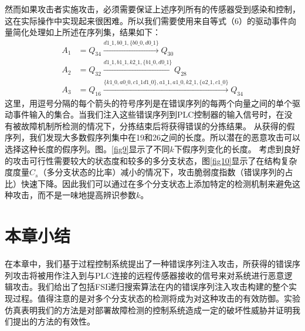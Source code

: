 然而如果攻击者实施攻击，必须需要保证上述序列所有的传感器受到感染和控制，这在实际操作中实现起来很困难。所以我们需要使用来自等式（6）的驱动事件向量简化处理如上所述在序列集，结果如下：\[\begin{split} A_1&=Q_{34}\xrightarrow{d1\_1,b0\_1,\{b0\_0,d0\_1\}}Q_{30}\\A_2&=Q_{32}\xrightarrow{d1\_1,b1\_1,k2\_1,\{b1\_0,d0\_1\}}Q_{28}\\A_3&=Q_{16}\xrightarrow{\{k1\_0,a0\_0,c1\_1d1\_0\},a1\_1,a1\_0,k2\_1,\{a2\_1,c1\_0\}}Q_{34} \end{split}\]这里，用逗号分隔的每个箭头的符号序列是在错误序列的每两个向量之间的单个驱动事件输入的集合。当我们注入这些错误序列到PLC控制器的输入信号时，在没有被故障机制所检测的情况下，分拣结束后将获得错误的分拣结果。
从获得的假序列，我们发现大多数假序列集中在19和26之间的长度。所以潜在的恶意攻击可以选择这种长度的假序列。图。\ref{fig9}显示了不同$ k $下假序列变化的长度。
考虑到良好的攻击可行性需要较大的状态度和较多的多分支状态，图\ref{fig10}显示了在结构复杂度度量$ C_s $（多分支状态的比率）减小的情况下，攻击脆弱度指数（错误序列的占比）快速下降。因此我们可以通过在多个分支状态上添加特定的检测机制来避免这种攻击，而不是一味地提高辨识参数$ k $。

\section{本章小结}

在本章中，我们基于过程控制系统提出了一种错误序列注入攻击，所获得的错误序列攻击将被用作注入到与PLC连接的远程传感器接收的信号来对系统进行恶意逻辑攻击。我们给出了包括FSI递归搜索算法在内的错误序列注入攻击构建的整个实现过程。值得注意的是对多个分支状态的检测将成为对这种攻击的有效防御。实验仿真表明我们的方法是对部署故障检测的控制系统造成一定的破坏性威胁并证明我们提出的方法的有效性。

\label{sec:insertimage}

